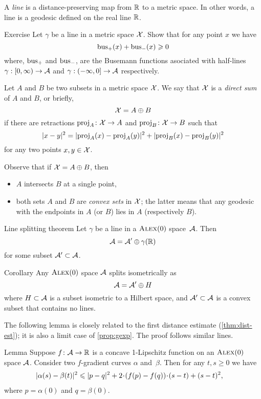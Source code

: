 A \emph{line} is a distance-preserving map
from $\RR$ to a metric space.
In other words, a line is a geodesic defined on the real line $\RR$.

\begin{thm}{Exercise}\label{ex:bus+bus}
Let $\gamma$ be a line in a metric space $\spc{X}$.
Show that for any point $x$ we have
\[\bus_+(x)+\bus_-(x)\ge 0\]
where, $\bus_+$ and $\bus_-$, are the Busemann functions asociated with half-lines $\gamma:[0,\infty)\to \spc{A}$ and $\gamma:(-\infty,0]\to \spc{A}$ respectively.
\end{thm}


Let $A$ and $B$ be two subsets in a metric space $\spc{X}$.
We say that $\spc{X}$ is a \emph{direct sum} of $A$ and $B$,
or briefly,
\[\spc{X}=A\oplus B\]
if there are retractions $\proj_A\:\spc{X}\to A$
and 
$\proj_B\:\spc{X}\to B$
such that 
\[\dist[2]{x}{y}{}=\dist[2]{\proj_A(x)}{\proj_A(y)}{}+\dist[2]{\proj_B(x)}{\proj_B(y)}{}\]
for any two points $x,y\in \spc{X}$.

Observe that if $\spc{X}=A\oplus B$, then
\begin{itemize}
\item $A$ intersects $B$ at a single point,
\item both sets $A$ and $B$ are \emph{convex sets} in $\spc{X}$;
the latter means that any geodesic with the endpoints in $A$ (or $B$) lies in $A$ (respectively $B$).
\end{itemize}

\begin{thm}{Line splitting theorem}\label{thm:splitting}
Let $\gamma$ be a line in a $\Alex0$ space~$\spc{A}$. 
Then 
\[\spc{A}=\spc{A}'\oplus \gamma(\RR)\]
for some subset $\spc{A}'\subset \spc{A}$.
\end{thm}

\begin{thm}{Corollary}\label{cor:splitting}
Any $\Alex0$ space $\spc{A}$ splits isometrically as
\[
\spc{A}=\spc{A}'\oplus H
\]
where $H\subset \spc{A}$ is a subset isometric to a Hilbert space, and $\spc{A}'\subset \spc{A}$ is a convex subset that contains no lines. 
\end{thm}

The following lemma is closely related to the first distance estimate (\ref{thm:dist-est});
it is also a limit case of \ref{prop:gexp}.
The proof follows similar  lines.

\begin{thm}{Lemma}\label{lem:dist-estimate}
Suppose $f\:\spc{A}\to\RR$ is a concave 1-Lipschitz function on an $\Alex0$ space $\spc{A}$.
Consider two $f$-gradient curves $\alpha$ and~$\beta$.
Then for any $t, s\ge 0$ we have
\begin{align*}
&\dist[2]{\alpha(s)}{\beta(t)}{}
\le 
\dist[2]{p}{q}{}+
2\cdot(f(p)-f(q))\cdot(s-t)+ (s-t)^2,
\end{align*}
where $p=\alpha(0)$ and $q=\beta(0)$.
\end{thm}

